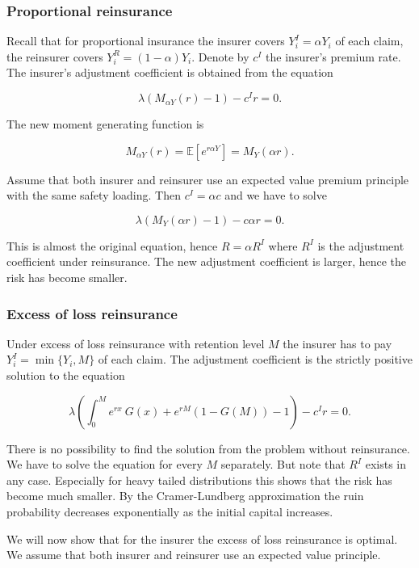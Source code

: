 \documentclass[a4paper,10pt,openany]{book}
\begin{document}
\hypertarget{proportional-reinsurance}{%
\subsubsection{Proportional reinsurance}\label{proportional-reinsurance}}

Recall that for proportional insurance the insurer covers \(Y_i^I = \alpha Y_i\) of each claim, the reinsurer covers \(Y_i^R = (1 − \alpha )Y_i\). Denote by \(c^I\) the insurer's premium rate. The insurer's adjustment coefficient is obtained from the equation

\[
\lambda (M_{\alpha Y} (r) − 1) − c^Ir = 0.
\]

The new moment generating function is

\[
M_{\alpha Y} (r) = \mathbb E [e^{r\alpha Y}] = M_Y (\alpha r).
\]

Assume that both insurer and reinsurer use an expected value premium principle with the same safety loading. Then \(c^I = \alpha c\) and we have to solve

\[
\lambda (M_Y (\alpha r) − 1) − c\alpha r = 0.
\]

This is almost the original equation, hence \(R = \alpha R^I\) where \(R^I\) is the adjustment coefficient under reinsurance. The new adjustment coefficient is larger, hence the risk has become smaller.

\hypertarget{excess-of-loss-reinsurance}{%
\subsubsection{Excess of loss reinsurance}\label{excess-of-loss-reinsurance}}

Under excess of loss reinsurance with retention level \(M\) the insurer has to pay \(Y_i^I = \min\{Y_i,M\}\) of each claim. The adjustment coefficient is the strictly positive solution to the equation

\[
\lambda \left(\int_0^Me^{rx}\ G(x) + e^{rM}(1-G(M))-1\right)-c^Ir=0.
\]

There is no possibility to find the solution from the problem without reinsurance. We have to solve the equation for every \(M\) separately. But note that \(R^I\) exists in any case. Especially for heavy tailed distributions this shows that the risk has become much smaller. By the Cramer-Lundberg approximation the ruin probability decreases exponentially as the initial capital increases.

We will now show that for the insurer the excess of loss reinsurance is optimal. We assume that both insurer and reinsurer use an expected value principle.
\end{document}
